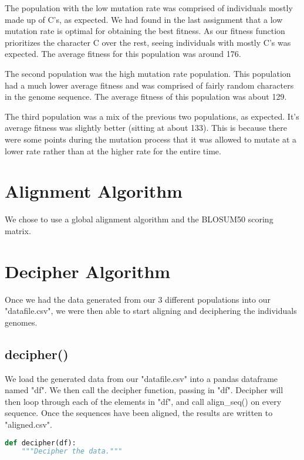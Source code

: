 \documentclass[a4paper, 12pt, one column]{article}
\begin{document}
\begin{multicols}{2}
The population with the low mutation rate was comprised of individuals mostly made up of C's, as expected. We had found in the last assignment that a low mutation rate is optimal for obtaining the best fitness. As our fitness function prioritizes the character C over the rest, seeing individuals with mostly C's was expected. The average fitness for this population was around 176.

The second population was the high mutation rate population. This population had a much lower average fitness and was comprised of fairly random characters in the genome sequence. The average fitness of this population was about 129. 

The third population was a mix of the previous two populations, as expected. It's average fitness was slightly better (sitting at about 133). This is because there were some points during the mutation process that it was allowed to mutate at a lower rate rather than at the higher rate for the entire time. 

\section{Alignment Algorithm}

We chose to use a global alignment algorithm and the BLOSUM50 scoring matrix. 

\section{Decipher Algorithm}
\par Once we had the data generated from our 3 different populations into our "datafile.csv", we were then able to start aligning and deciphering the individuals genomes. 


\subsection{decipher()}

\par We load the generated data from our "datafile.csv" into a pandas dataframe named "df". We then call the decipher function, passing in "df". Decipher will then loop through each of the elements in "df", and call align\_seq() on every sequence. Once the sequences have been aligned, the results are written to "aligned.csv".   

\begin{lstlisting}[language = python]
def decipher(df):
    """Decipher the data."""
    

\end{lstlisting}
\end{multicols}
\end{document}
